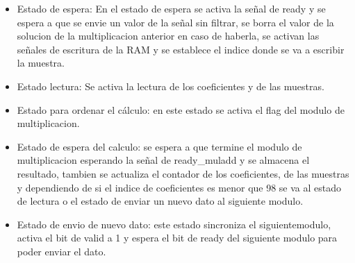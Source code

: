 \begin{itemize}
    \item Estado de espera: En el estado de espera se activa la señal de ready y se espera a que se envie un valor de la
    señal sin filtrar, se borra el valor de la solucion de la multiplicacion anterior en caso de haberla, se activan las
    señales de escritura de la RAM y se establece el indice donde se va a escribir la muestra.
    \item Estado lectura: Se activa la lectura de los coeficientes y de las muestras.
    \item Estado para ordenar el cálculo: en este estado se activa el flag del modulo de multiplicacion.
    \item Estado de espera del calculo: se espera a que termine el modulo de multiplicacion esperando la señal de ready\_muladd
    y se almacena el resultado, tambien se actualiza el contador de los coeficientes, de las muestras y dependiendo de si el 
    indice de coeficientes es menor que 98 se va al estado de lectura o el estado de enviar un nuevo dato al siguiente modulo.
    \item Estado de envio de nuevo dato: este estado sincroniza el siguientemodulo, activa el bit de valid a 1 y espera el bit
    de ready del siguiente modulo para poder enviar el dato.
\end{itemize}

